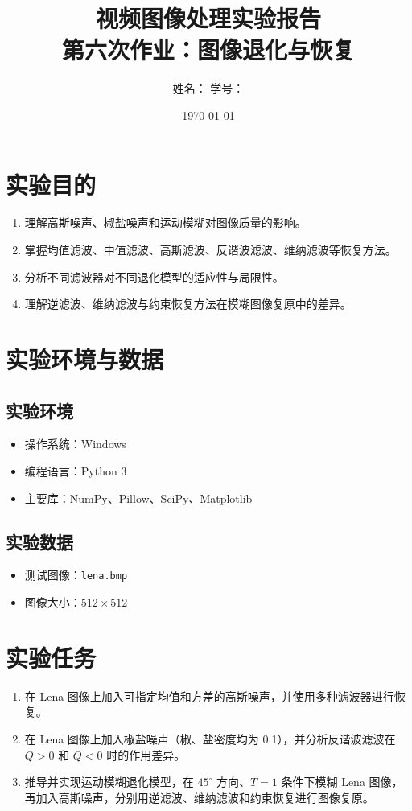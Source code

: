 \documentclass[UTF8,a4paper,12pt]{ctexart}
\title{视频图像处理实验报告\\第六次作业：图像退化与恢复}
\author{姓名：\underline{\hspace{3cm}} \quad 学号：\underline{\hspace{3cm}}}
\date{\today}
\begin{document}
\maketitle
\tableofcontents
\newpage

\section{实验目的}
\begin{enumerate}
  \item 理解高斯噪声、椒盐噪声和运动模糊对图像质量的影响。
  \item 掌握均值滤波、中值滤波、高斯滤波、反谐波滤波、维纳滤波等恢复方法。
  \item 分析不同滤波器对不同退化模型的适应性与局限性。
  \item 理解逆滤波、维纳滤波与约束恢复方法在模糊图像复原中的差异。
\end{enumerate}

\section{实验环境与数据}
\subsection{实验环境}
\begin{itemize}
  \item 操作系统：Windows
  \item 编程语言：Python 3
  \item 主要库：NumPy、Pillow、SciPy、Matplotlib
\end{itemize}

\subsection{实验数据}
\begin{itemize}
  \item 测试图像：\texttt{lena.bmp}
  \item 图像大小：$512\times512$
\end{itemize}

\section{实验任务}
\begin{enumerate}
  \item 在 Lena 图像上加入可指定均值和方差的高斯噪声，并使用多种滤波器进行恢复。
  \item 在 Lena 图像上加入椒盐噪声（椒、盐密度均为 0.1），并分析反谐波滤波在 $Q>0$ 和 $Q<0$ 时的作用差异。
  \item 推导并实现运动模糊退化模型，在 $45^\circ$ 方向、$T=1$ 条件下模糊 Lena 图像，再加入高斯噪声，分别用逆滤波、维纳滤波和约束恢复进行图像复原。
\end{enumerate}
\end{document}
